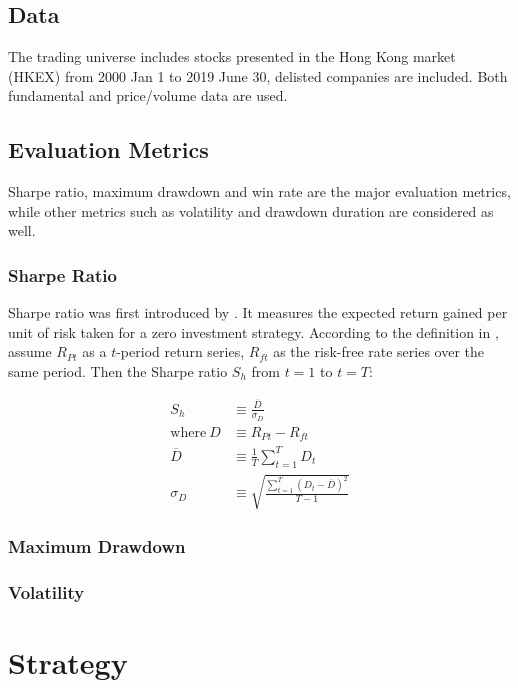 \documentclass[12pt]{article}
\begin{document}
\subsection{Data}

The trading universe includes stocks presented in the Hong Kong market (HKEX) from 2000 Jan 1 to 2019 June 30, delisted companies are included. Both fundamental and price/volume data are used.

\subsection{Evaluation Metrics}

Sharpe ratio, maximum drawdown and win rate are the major evaluation metrics, while other metrics such as volatility and drawdown duration are considered as well.

\subsubsection{Sharpe Ratio}

Sharpe ratio was first introduced by \cite{sharpe1966}. It measures the expected return gained per unit of risk taken for a zero investment strategy. According to the definition in \cite{sharpe1994}, assume \(R_{Pt}\) as a \(t\)-period return series, \(R_{ft}\) as the risk-free rate series over the same period. Then the Sharpe ratio \(S_h\) from \(t=1\) to \(t=T\):

\begin{align*}
  S_h &\equiv \frac{\overline{D}}{\sigma_D} \\
  \text{where}~D &\equiv R_{Pt} - R_{ft} \\
  \overline{D} &\equiv \frac{1}{T} \sum_{t=1}^T D_t \\
  \sigma_D &\equiv \sqrt{\frac{\sum_{t=1}^T (D_t-\overline{D})^2}{T-1}}
\end{align*}

\subsubsection{Maximum Drawdown}

\subsubsection{Volatility}

\section{Strategy}
\end{document}
